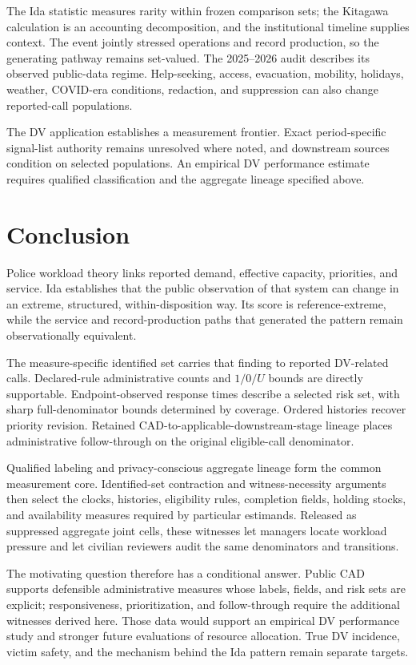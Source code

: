 \documentclass[11pt]{article}
\begin{document}
The Ida statistic measures rarity within frozen comparison sets; the Kitagawa calculation is an accounting decomposition, and the institutional timeline supplies context. The event jointly stressed operations and record production, so the generating pathway remains set-valued. The 2025--2026 audit describes its observed public-data regime. Help-seeking, access, evacuation, mobility, holidays, weather, COVID-era conditions, redaction, and suppression can also change reported-call populations.

The DV application establishes a measurement frontier. Exact period-specific signal-list authority remains unresolved where noted, and downstream sources condition on selected populations. An empirical DV performance estimate requires qualified classification and the aggregate lineage specified above.

\section{Conclusion}

Police workload theory links reported demand, effective capacity, priorities, and service. Ida establishes that the public observation of that system can change in an extreme, structured, within-disposition way. Its score is reference-extreme, while the service and record-production paths that generated the pattern remain observationally equivalent.

The measure-specific identified set carries that finding to reported DV-related calls. Declared-rule administrative counts and $1/0/U$ bounds are directly supportable. Endpoint-observed response times describe a selected risk set, with sharp full-denominator bounds determined by coverage. Ordered histories recover priority revision. Retained CAD-to-applicable-downstream-stage lineage places administrative follow-through on the original eligible-call denominator.

Qualified labeling and privacy-conscious aggregate lineage form the common measurement core. Identified-set contraction and witness-necessity arguments then select the clocks, histories, eligibility rules, completion fields, holding stocks, and availability measures required by particular estimands. Released as suppressed aggregate joint cells, these witnesses let managers locate workload pressure and let civilian reviewers audit the same denominators and transitions.

The motivating question therefore has a conditional answer. Public CAD supports defensible administrative measures whose labels, fields, and risk sets are explicit; responsiveness, prioritization, and follow-through require the additional witnesses derived here. Those data would support an empirical DV performance study and stronger future evaluations of resource allocation. True DV incidence, victim safety, and the mechanism behind the Ida pattern remain separate targets.



\end{document}
